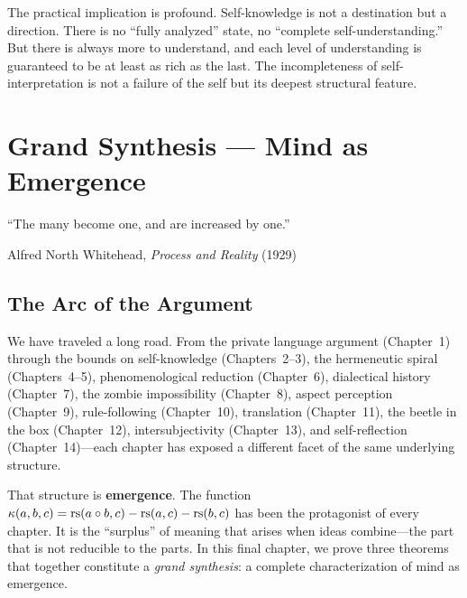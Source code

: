 The practical implication is profound.  Self-knowledge is not a destination but
a direction.  There is no ``fully analyzed'' state, no ``complete
self-understanding.''  But there is always more to understand, and each level
of understanding is guaranteed to be at least as rich as the last.  The
incompleteness of self-interpretation is not a failure of the self but its
deepest structural feature.



\chapter{Grand Synthesis --- Mind as Emergence}
\label{ch:grand-synthesis}

\epigraph{``The many become one, and are increased by one.''}{Alfred North
Whitehead, \textit{Process and Reality} (1929)}

\section{The Arc of the Argument}

We have traveled a long road.  From the private language argument (Chapter~1)
through the bounds on self-knowledge (Chapters~2--3), the hermeneutic spiral
(Chapters~4--5), phenomenological reduction (Chapter~6), dialectical history
(Chapter~7), the zombie impossibility (Chapter~8), aspect perception
(Chapter~9), rule-following (Chapter~10), translation (Chapter~11), the
beetle in the box (Chapter~12), intersubjectivity (Chapter~13), and
self-reflection (Chapter~14)---each chapter has exposed a different facet
of the same underlying structure.

That structure is \textbf{emergence}.  The function $\kappa(a, b, c) =
\mathrm{rs}(a \circ b, c) - \mathrm{rs}(a, c) - \mathrm{rs}(b, c)$ has been the protagonist of
every chapter.  It is the ``surplus'' of meaning that arises when ideas
combine---the part that is not reducible to the parts.  In this final chapter,
we prove three theorems that together constitute a \emph{grand synthesis}:
a complete characterization of mind as emergence.

